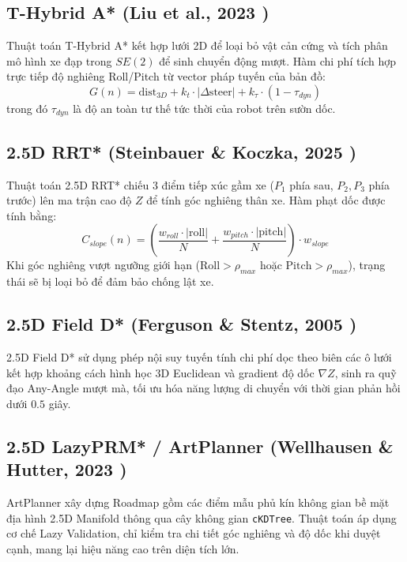 \documentclass[a4paper,12pt]{article}
\begin{document}
\subsection{T-Hybrid A* (Liu et al., 2023 \cite{jiayangliu2023})}
Thuật toán T-Hybrid A* \cite{jiayangliu2023} kết hợp lưới 2D để loại bỏ vật cản cứng và tích phân mô hình xe đạp trong $SE(2)$ để sinh chuyển động mượt. Hàm chi phí tích hợp trực tiếp độ nghiêng Roll/Pitch từ vector pháp tuyến của bản đồ:
\begin{equation}
    G(n) = \text{dist}_{3D} + k_t \cdot |\Delta \text{steer}| + k_{\tau} \cdot (1 - \tau_{dyn})
\end{equation}
trong đó $\tau_{dyn}$ là độ an toàn tư thế tức thời của robot trên sườn dốc.

\subsection{2.5D RRT* (Steinbauer \& Koczka, 2025 \cite{geraldsteinbauer2025})}
Thuật toán 2.5D RRT* \cite{geraldsteinbauer2025} chiếu 3 điểm tiếp xúc gầm xe ($P_1$ phía sau, $P_2, P_3$ phía trước) lên ma trận cao độ $Z$ để tính góc nghiêng thân xe. Hàm phạt dốc được tính bằng:
\begin{equation}
    C_{slope}(n) = \left( \frac{w_{roll} \cdot |\text{roll}|}{N} + \frac{w_{pitch} \cdot |\text{pitch}|}{N} \right) \cdot w_{slope}
\end{equation}
Khi góc nghiêng vượt ngưỡng giới hạn ($\text{Roll} > \rho_{max}$ hoặc $\text{Pitch} > \rho_{max}$), trạng thái sẽ bị loại bỏ để đảm bảo chống lật xe.

\subsection{2.5D Field D* (Ferguson \& Stentz, 2005 \cite{fergusondavid2005})}
2.5D Field D* \cite{fergusondavid2005} sử dụng phép nội suy tuyến tính chi phí dọc theo biên các ô lưới kết hợp khoảng cách hình học 3D Euclidean và gradient độ dốc $\nabla Z$, sinh ra quỹ đạo Any-Angle mượt mà, tối ưu hóa năng lượng di chuyển với thời gian phản hồi dưới $0.5$ giây.

\subsection{2.5D LazyPRM* / ArtPlanner (Wellhausen \& Hutter, 2023 \cite{lorenzwellhausen2023})}
ArtPlanner \cite{lorenzwellhausen2023} xây dựng Roadmap gồm các điểm mẫu phủ kín không gian bề mặt địa hình 2.5D Manifold thông qua cây không gian \texttt{cKDTree}. Thuật toán áp dụng cơ chế Lazy Validation, chỉ kiểm tra chi tiết góc nghiêng và độ dốc khi duyệt cạnh, mang lại hiệu năng cao trên diện tích lớn.
\end{document}
